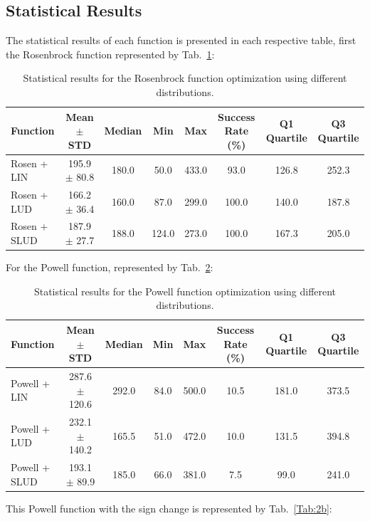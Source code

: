 \documentclass[10pt,fleqn,a4paper,twoside]{article}
\begin{document}
\subsection{Statistical Results}

The statistical results of each function is presented in each respective table, first the Rosenbrock function represented by Tab.~\ref{Tab:1}:


\begin{table}[H]
\centering
\caption{Statistical results for the Rosenbrock function optimization using different distributions.}
\label{Tab:1}
\begin{tabular}{l|c|c|c|c|c|c|c}
\hline
\textbf{Function} & \textbf{Mean $\pm$ STD} & \textbf{Median} & \textbf{Min} & \textbf{Max} & \textbf{Success Rate (\%)} & \textbf{Q1 Quartile} & \textbf{Q3 Quartile}\\
\hline
Rosen + LIN            & 195.9 $\pm$ 80.8      & 180.0 & 50.0 & 433.0 & 93.0 & 126.8 & 252.3\\
Rosen + LUD            & 166.2 $\pm$ 36.4      & 160.0 & 87.0 & 299.0 & 100.0 & 140.0 & 187.8\\
Rosen + SLUD           & 187.9 $\pm$ 27.7      & 188.0 & 124.0 & 273.0 & 100.0 & 167.3 & 205.0\\
\hline
\end{tabular}
\end{table}

For the Powell function, represented by Tab.~\ref{Tab:2}:

\begin{table}[H]
\centering
\caption{Statistical results for the Powell function optimization using different distributions.}
\label{Tab:2}
\begin{tabular}{l|c|c|c|c|c|c|c}
\hline
\textbf{Function} & \textbf{Mean $\pm$ STD} & \textbf{Median} & \textbf{Min} & \textbf{Max} & \textbf{Success Rate (\%)} & \textbf{Q1 Quartile} & \textbf{Q3 Quartile}\\
\hline
Powell + LIN         & 287.6 $\pm$ 120.6     & 292.0 & 84.0 & 500.0 & 10.5 & 181.0 & 373.5\\
Powell + LUD         & 232.1 $\pm$ 140.2     & 165.5 & 51.0 & 472.0 & 10.0 & 131.5 & 394.8\\
Powell + SLUD        & 193.1 $\pm$ 89.9      & 185.0 & 66.0 & 381.0 & 7.5 & 99.0 & 241.0\\
\hline
\end{tabular}
\end{table}

This Powell function with the sign change is represented by Tab.~\ref{Tab:2b}:
\end{document}
